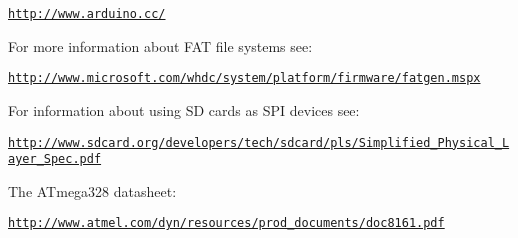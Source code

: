 \href{http://www.arduino.cc/}{\tt http\-://www.\-arduino.\-cc/}

For more information about F\-A\-T file systems see\-:

\href{http://www.microsoft.com/whdc/system/platform/firmware/fatgen.mspx}{\tt http\-://www.\-microsoft.\-com/whdc/system/platform/firmware/fatgen.\-mspx}

For information about using S\-D cards as S\-P\-I devices see\-:

\href{http://www.sdcard.org/developers/tech/sdcard/pls/Simplified_Physical_Layer_Spec.pdf}{\tt http\-://www.\-sdcard.\-org/developers/tech/sdcard/pls/\-Simplified\-\_\-\-Physical\-\_\-\-Layer\-\_\-\-Spec.\-pdf}

The A\-Tmega328 datasheet\-:

\href{http://www.atmel.com/dyn/resources/prod_documents/doc8161.pdf}{\tt http\-://www.\-atmel.\-com/dyn/resources/prod\-\_\-documents/doc8161.\-pdf} 
